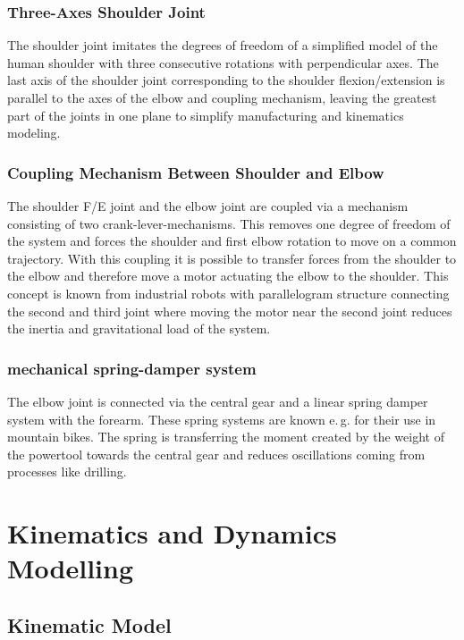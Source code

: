 \documentclass[letterpaper, 10 pt, conference]{ieeeconf}  %
\begin{document}
\subsubsection{Three-Axes Shoulder Joint}

The shoulder joint imitates the degrees of freedom of a simplified model of the human shoulder with three consecutive rotations with perpendicular axes.
The last axis of the shoulder joint corresponding to the shoulder flexion/extension is parallel to the axes of the elbow and coupling mechanism, leaving the greatest part of the joints in one plane to simplify manufacturing and kinematics modeling.

\subsubsection{Coupling Mechanism Between Shoulder and Elbow}

The shoulder F/E joint and the elbow joint are coupled via a mechanism consisting of two crank-lever-mechanisms.
This removes one degree of freedom of the system and forces the shoulder and first elbow rotation to move on a common trajectory.
With this coupling it is possible to transfer forces from the shoulder to the elbow and therefore move a motor actuating the elbow to the shoulder.
This concept is known from industrial robots with parallelogram structure connecting the second and third joint where moving the motor near the second joint reduces the inertia and gravitational load of the system.

\subsubsection{mechanical spring-damper system}

The elbow joint is connected via the central gear and a linear spring damper system with the forearm.
These spring systems are known e.\,g. for their use in mountain bikes.
The spring is transferring the moment created by the weight of the powertool towards the central gear and reduces oscillations coming from processes like drilling.

\section{Kinematics and Dynamics Modelling}

\subsection{Kinematic Model}
\end{document}

